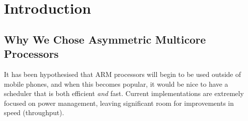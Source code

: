 \section{Introduction}
\subsection{Why We Chose Asymmetric Multicore Processors}
It has been hypothesised that ARM processors will begin to be used outside of mobile phones, and when this becomes popular, it would be nice to have a scheduler that is both efficient \textit{and} fast. Current implementations are extremely focused on power management, leaving significant room for improvements in speed (throughput).
